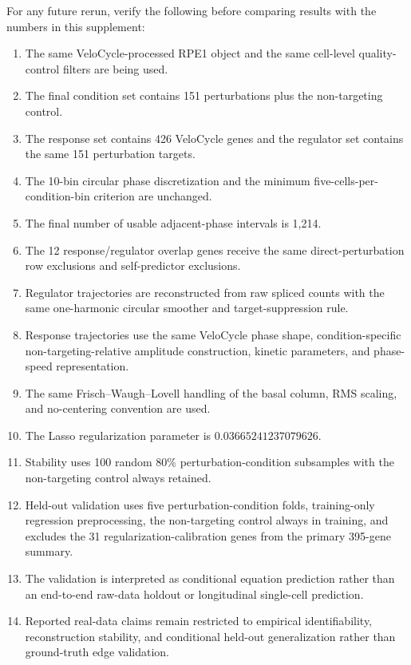 \documentclass[supplement,onefignum,onetabnum]{siamart251216}
\begin{document}
For any future rerun, verify the following before comparing results with the numbers in this supplement:
\begin{enumerate}
\item The same VeloCycle-processed RPE1 object and the same cell-level quality-control filters are being used.
\item The final condition set contains 151 perturbations plus the non-targeting control.
\item The response set contains 426 VeloCycle genes and the regulator set contains the same 151 perturbation targets.
\item The 10-bin circular phase discretization and the minimum five-cells-per-condition-bin criterion are unchanged.
\item The final number of usable adjacent-phase intervals is 1,214.
\item The 12 response/regulator overlap genes receive the same direct-perturbation row exclusions and self-predictor exclusions.
\item Regulator trajectories are reconstructed from raw spliced counts with the same one-harmonic circular smoother and target-suppression rule.
\item Response trajectories use the same VeloCycle phase shape, condition-specific non-targeting-relative amplitude construction, kinetic parameters, and phase-speed representation.
\item The same Frisch--Waugh--Lovell handling of the basal column, RMS scaling, and no-centering convention are used.
\item The Lasso regularization parameter is \(0.03665241237079626\).
\item Stability uses 100 random 80\% perturbation-condition subsamples with the non-targeting control always retained.
\item Held-out validation uses five perturbation-condition folds, training-only regression preprocessing, the non-targeting control always in training, and excludes the 31 regularization-calibration genes from the primary 395-gene summary.
\item The validation is interpreted as conditional equation prediction rather than an end-to-end raw-data holdout or longitudinal single-cell prediction.
\item Reported real-data claims remain restricted to empirical identifiability, reconstruction stability, and conditional held-out generalization rather than ground-truth edge validation.
\end{enumerate}

% 
% 
\end{document}
